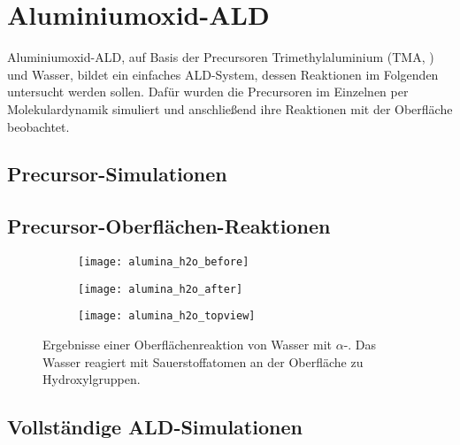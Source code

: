 \section{Aluminiumoxid-ALD}
\label{aluminaald}

Aluminiumoxid-ALD, auf Basis der Precursoren Trimethylaluminium (TMA, ) und Wasser, bildet ein einfaches ALD-System, dessen Reaktionen im Folgenden untersucht werden sollen.
Dafür wurden die Precursoren im Einzelnen per Molekulardynamik simuliert und anschließend ihre Reaktionen mit der Oberfläche beobachtet.

\subsection{Precursor-Simulationen}

\subsection{Precursor-Oberflächen-Reaktionen}

\begin{figure}[hp]
  \captionsetup[subfigure]{singlelinecheck=false}
  \def\subfigwidth{0.32\textwidth}
  \begin{subfigure}[t]{\subfigwidth}
    \texttt{[image: alumina\_h2o\_before]}
  \end{subfigure}
  \hfill
  \begin{subfigure}[t]{\subfigwidth}
    \texttt{[image: alumina\_h2o\_after]}
  \end{subfigure}
  \hfill
  \begin{subfigure}[t]{\subfigwidth}
    \texttt{[image: alumina\_h2o\_topview]}
  \end{subfigure}
  \caption[Oberflächenreaktion von Wasser mit $\alpha$-]{Ergebnisse einer Oberflächenreaktion von Wasser mit $\alpha$-.
    Das Wasser reagiert mit Sauerstoffatomen an der Oberfläche zu Hydroxylgruppen.
  }
  \label{fig:wateraluminasurface}
\end{figure}

\subsection{Vollständige ALD-Simulationen}

